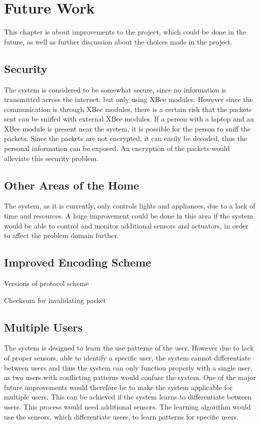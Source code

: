 \chapter{Future Work}
\label{chap:future_work}
This chapter is about improvements to the project, which could be done in the future, as well as further discussion about the choices made in the project.

\section{Security}
The system is considered to be somewhat secure, since no information is transmitted across the internet, but only using XBee modules. However since the communication is through XBee modules, there is a certain risk that the packets sent can be sniffed with external XBee modules. If a person with a laptop and an XBee module is present near the system, it is possible for the person to sniff the packets. Since the packets are not encrypted, it can easily be decoded, thus the personal information can be exposed. An encryption of the packets would alleviate this security problem.

\section{Other Areas of the Home}
The system, as it is currently, only controls lights and appliances, due to a lack of time and resources. A huge improvement could be done in this area if the system would be able to control and monitor additional sensors and actuators, in order to affect the problem domain further.

\section{Improved Encoding Scheme}
Versions of protocol scheme

Checksum for invalidating packet

\section{Multiple Users}
The system is designed to learn the use patterns of the user. However due to lack of proper sensors, able to identify a specific user, the system cannot differentiate between users and thus the system can only function properly with a single user, as two users with conflicting patterns would confuse the system. One of the major future improvements would therefore be to make the system applicable for multiple users. This can be achieved if the system learns to differentiate between users. This process would need additional sensors. The learning algorithm would use the sensors, which differentiate users, to learn patterns for specific users.

